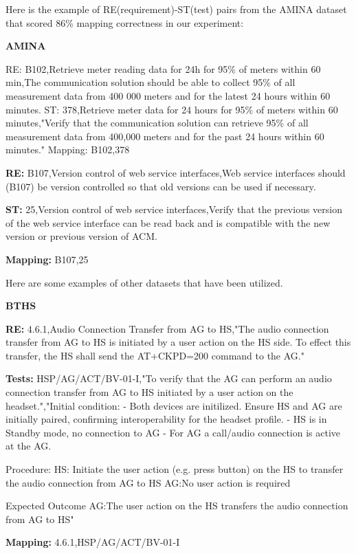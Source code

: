 \documentclass[conference]{IEEEtran}
\begin{document}


Here is the example of RE(requirement)-ST(test) pairs from the AMINA dataset that scored 86\% mapping correctness in our experiment: 

\textbf{AMINA}
  \begin{databox}
    RE: B102,Retrieve meter reading data for 24h for 95\% of meters within 60 min,The communication solution should be able to collect 95\% of all measurement data from 400 000 meters and for the latest 24 hours within 60 minutes.
    ST: 378,Retrieve meter data for 24 hours for 95\% of meters within 60 minutes,"Verify that the communication solution can retrieve 95\% of all measurement data from 400,000 meters and for the past 24 hours within 60 minutes."
    Mapping: B102,378
\end{databox}


 \begin{roundedBox-sm}
    \textbf{RE:} B107,Version control of web service interfaces,Web service interfaces should (B107) be version controlled so that old versions can be used if necessary.
    
    \textbf{ST:} 25,Version control of web service interfaces,Verify that the previous version of the web service interface can be read back and is compatible with the new version or previous version of ACM.
    
    \textbf{Mapping:} B107,25
\end{roundedBox-sm}

Here are some examples of other datasets that have been utilized.

\textbf{BTHS}
 \begin{roundedBox-sm}
    \textbf{RE:} 4.6.1,Audio Connection Transfer from AG to HS,"The audio connection transfer from AG to HS is initiated by a user action on the HS side. To effect this transfer, the HS shall send the AT+CKPD=200 command to the AG."
    
    \textbf{Tests:} HSP/AG/ACT/BV-01-I,"To verify that the AG can perform an audio connection transfer from AG to HS initiated by a user
action on the headset.","Initial condition: 
- Both devices are initilized. Ensure HS and AG are initially paired, confirming interoperability for the headset profile. 
- HS is in Standby mode, no connection to AG
- For AG a call/audio connection is active at the AG.

Procedure: 
HS: Initiate the user action (e.g. press button) on the HS to transfer the audio connection from AG to HS
AG:No user action is required
  
Expected Outcome AG:The user action on the HS transfers the audio connection from AG to HS"
    
    \textbf{Mapping:} 4.6.1,HSP/AG/ACT/BV-01-I
\end{roundedBox-sm}
\end{document}

